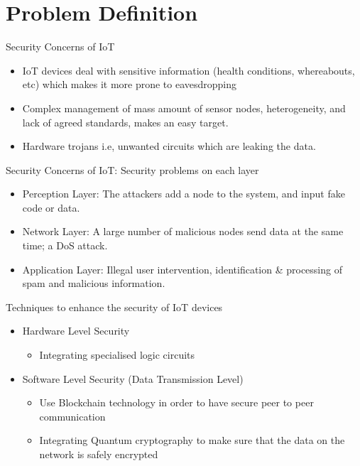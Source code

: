 \documentclass{beamer}
\begin{document}
\section{Problem Definition}

\begin{frame}{Security Concerns of IoT}
    \begin{itemize}
        \item {IoT devices deal with sensitive information (health conditions, whereabouts, etc) which makes it more prone to eavesdropping \cite{qu_cr_2017}}
        \item {Complex management of mass amount of sensor nodes, heterogeneity, and lack of agreed standards, makes an easy target. \cite{qu_iot_2019}}
        \item {Hardware trojans i.e, unwanted circuits which are leaking the data. \cite{sw_hw_sec_2021}}        
    \end{itemize}
\end{frame}

\begin{frame}{Security Concerns of IoT: Security problems on each layer}
    \begin{itemize}
        \item {Perception Layer: The attackers add a node to the system, and input fake code or data. \cite{su_iot_2013}}
        \item {Network Layer: A large number of malicious nodes send data at the same time; a DoS attack. \cite{su_iot_2013}}
        \item {Application Layer: Illegal user intervention, identification \& processing of spam and malicious information. \cite{su_iot_2013}}
    \end{itemize}
\end{frame}

\begin{frame} {Techniques to enhance the security of IoT devices}


    \begin{itemize}
    
    \item {Hardware Level Security}
        \begin{itemize}
            \item {Integrating specialised logic circuits}
        \end{itemize}
        \item {Software Level Security (Data Transmission Level)}
        \begin{itemize}
            \item {Use Blockchain technology in order to have secure peer to peer communication}
            \item {Integrating Quantum cryptography to make sure that the data on the network is safely encrypted}
        \end{itemize}
        
    \end{itemize}
\end{frame}
\end{document}
